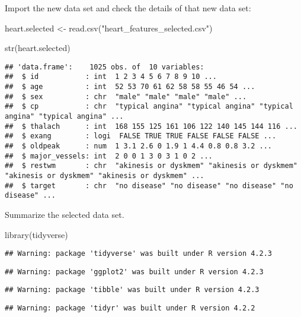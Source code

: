 \documentclass[
]{article}
\newenvironment{Shaded}{\begin{snugshade}}{\end{snugshade}}
\newcommand{\FunctionTok}[1]{\textcolor[rgb]{0.00,0.00,0.00}{#1}}
\newcommand{\NormalTok}[1]{#1}
\newcommand{\OtherTok}[1]{\textcolor[rgb]{0.56,0.35,0.01}{#1}}
\newcommand{\StringTok}[1]{\textcolor[rgb]{0.31,0.60,0.02}{#1}}
\begin{document}
Import the new data set and check the details of that new data set:

\begin{Shaded}
\begin{Highlighting}[]
\NormalTok{heart.selected }\OtherTok{\textless{}{-}} \FunctionTok{read.csv}\NormalTok{(}\StringTok{"heart\_features\_selected.csv"}\NormalTok{)}

\FunctionTok{str}\NormalTok{(heart.selected)}
\end{Highlighting}
\end{Shaded}

\begin{verbatim}
## 'data.frame':    1025 obs. of  10 variables:
##  $ id           : int  1 2 3 4 5 6 7 8 9 10 ...
##  $ age          : int  52 53 70 61 62 58 58 55 46 54 ...
##  $ sex          : chr  "male" "male" "male" "male" ...
##  $ cp           : chr  "typical angina" "typical angina" "typical angina" "typical angina" ...
##  $ thalach      : int  168 155 125 161 106 122 140 145 144 116 ...
##  $ exang        : logi  FALSE TRUE TRUE FALSE FALSE FALSE ...
##  $ oldpeak      : num  1 3.1 2.6 0 1.9 1 4.4 0.8 0.8 3.2 ...
##  $ major_vessels: int  2 0 0 1 3 0 3 1 0 2 ...
##  $ restwm       : chr  "akinesis or dyskmem" "akinesis or dyskmem" "akinesis or dyskmem" "akinesis or dyskmem" ...
##  $ target       : chr  "no disease" "no disease" "no disease" "no disease" ...
\end{verbatim}

Summarize the selected data set.

\begin{Shaded}
\begin{Highlighting}[]
\FunctionTok{library}\NormalTok{(tidyverse)}
\end{Highlighting}
\end{Shaded}

\begin{verbatim}
## Warning: package 'tidyverse' was built under R version 4.2.3
\end{verbatim}

\begin{verbatim}
## Warning: package 'ggplot2' was built under R version 4.2.3
\end{verbatim}

\begin{verbatim}
## Warning: package 'tibble' was built under R version 4.2.3
\end{verbatim}

\begin{verbatim}
## Warning: package 'tidyr' was built under R version 4.2.2
\end{verbatim}
\end{document}
